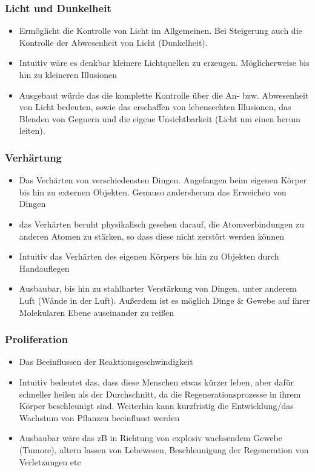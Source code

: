 \subsubsection{Licht und Dunkelheit} \label{sec:lichtmagie}
\begin{itemize}
	\item Ermöglicht die Kontrolle von Licht im Allgemeinen. Bei Steigerung auch die Kontrolle der Abwesenheit von Licht (Dunkelheit).
	\item Intuitiv wäre es denkbar kleinere Lichtquellen zu erzeugen. Möglicherweise bis hin zu kleineren Illusionen
	\item Ausgebaut würde das die komplette Kontrolle über die An- bzw. Abwesenheit von Licht bedeuten, sowie das erschaffen von lebensechten Illusionen, das Blenden von Gegnern und die eigene Unsichtbarkeit (Licht um einen herum leiten).
\end{itemize}

\subsubsection{Verhärtung}\label{sec:haertungsmagie}
\begin{itemize}
	\item Das Verhärten von verschiedensten Dingen. Angefangen beim eigenen Körper bis hin zu externen Objekten. Genauso andersherum das Erweichen von Dingen
	\item das Verhärten beruht physikalisch gesehen darauf, die Atomverbindungen zu anderen Atomen zu stärken, so dass diese nicht zerstört werden können
	\item Intuitiv das Verhärten des eigenen Körpers bis hin zu Objekten durch Handauflegen
	\item Ausbaubar, bis hin zu stahlharter Verstärkung von Dingen, unter anderem Luft (Wände in der Luft). Außerdem ist es möglich Dinge \& Gewebe auf ihrer Molekularen Ebene auseinander zu reißen
\end{itemize}

\subsubsection{Proliferation}\label{sec:proliferationsmagie}
\begin{itemize}
	\item Das Beeinflussen der Reaktionsgeschwindigkeit
	\item Intuitiv bedeutet das, dass diese Menschen etwas kürzer leben, aber dafür schneller heilen als der Durchschnitt, da die Regenerationsprozesse in ihrem Körper beschleunigt sind. Weiterhin kann kurzfristig die Entwicklung/das Wachstum von Pflanzen beeinflusst werden
	\item Ausbaubar wäre das zB in Richtung von explosiv wachsendem Gewebe (Tumore), altern lassen von Lebewesen, Beschleunigung der Regeneration von Verletzungen etc
\end{itemize}

